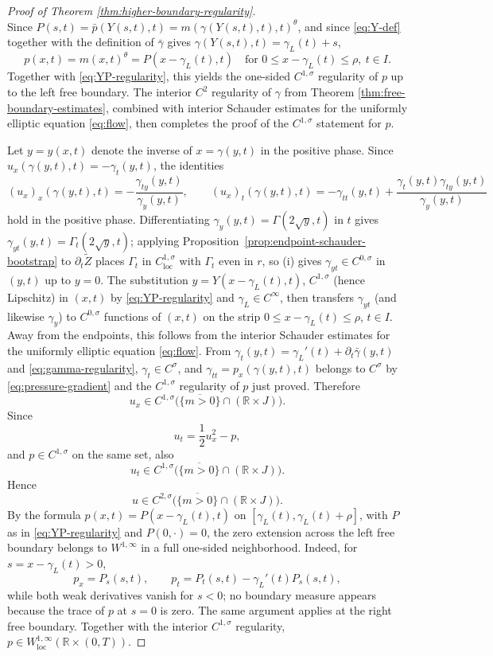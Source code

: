 \documentclass[11pt]{amsart}
\newcommand{\R}{\mathbb R}
\newcommand{\loc}{\mathrm{loc}}
\begin{document}
\begin{proof}[Proof of Theorem \ref{thm:higher-boundary-regularity}]
\begin{equation}
\end{equation}
Since \(P(s,t)=\bar{p}(Y(s,t),t)=m(\gamma(Y(s,t),t),t)^\theta\), and since
\eqref{eq:Y-def} together with the definition of \(\bar{\gamma}\) gives
\(\gamma(Y(s,t),t)=\gamma_L(t)+s\),
\[
        p(x,t)=m(x,t)^\theta=P(x-\gamma_L(t),t)
        \quad\text{for } 0\le x-\gamma_L(t)\le\rho,\ t\in I .
\]
Together with \eqref{eq:YP-regularity}, this yields the one-sided
\(C^{1,\sigma}\) regularity of \(p\) up to the left free boundary.
The interior \(C^2\) regularity of
\(\gamma\) from Theorem \ref{thm:free-boundary-estimates}, combined with
interior Schauder estimates for the uniformly elliptic equation
\eqref{eq:flow}, then completes the proof of the
\(C^{1,\sigma}\) statement for \(p\).

Let \(y=y(x,t)\) denote the inverse of \(x=\gamma(y,t)\) in the positive
phase. Since \(u_x(\gamma(y,t),t)=-\gamma_t(y,t)\), the identities
\[
        (u_x)_x(\gamma(y,t),t)=-\frac{\gamma_{ty}(y,t)}{\gamma_y(y,t)},
        \qquad
        (u_x)_t(\gamma(y,t),t)
        =-\gamma_{tt}(y,t)+\frac{\gamma_t(y,t)\gamma_{ty}(y,t)}
        {\gamma_y(y,t)}
\]
hold in the positive phase. Differentiating
\(\gamma_y(y,t)=\Gamma(2\sqrt y,t)\) in \(t\) gives
\(\gamma_{yt}(y,t)=\Gamma_t(2\sqrt y,t)\); applying
Proposition~\ref{prop:endpoint-schauder-bootstrap} to \(\partial_t\widetilde Z\) places
\(\Gamma_t\) in \(C^{1,\sigma}_{\loc}\) with \(\Gamma_t\) even in \(r\), so (i) gives
\(\gamma_{yt}\in C^{0,\sigma}\) in \((y,t)\) up to \(y=0\). The substitution
\(y=Y(x-\gamma_L(t),t)\), \(C^{1,\sigma}\) (hence Lipschitz) in \((x,t)\) by
\eqref{eq:YP-regularity} and \(\gamma_L\in C^\infty\), then transfers
\(\gamma_{yt}\) (and likewise \(\gamma_y\)) to \(C^{0,\sigma}\) functions of
\((x,t)\) on the strip \(0\le x-\gamma_L(t)\le\rho\), \(t\in I\). Away from the endpoints, this follows from the interior
Schauder estimates for the uniformly elliptic equation \eqref{eq:flow}.
From \(\gamma_t(y,t)=\gamma_L'(t)+\partial_t\bar{\gamma}(y,t)\) and
\eqref{eq:gamma-regularity}, \(\gamma_t\in C^\sigma\), and
\(\gamma_{tt}=p_x(\gamma(y,t),t)\) belongs to \(C^\sigma\) by
\eqref{eq:pressure-gradient} and the \(C^{1,\sigma}\) regularity of \(p\) just
proved.
Therefore
\[
        u_x\in
        C^{1,\sigma}\bigl(\overline{\{m>0\}}\cap(\R\times J)\bigr).
\]
Since
\[
        u_t=\frac12u_x^2-p,
\]
and \(p\in C^{1,\sigma}\) on the same set, also
\[
        u_t\in
        C^{1,\sigma}\bigl(\overline{\{m>0\}}\cap(\R\times J)\bigr).
\]
Hence
\[
        u\in
        C^{2,\sigma}\bigl(\overline{\{m>0\}}\cap(\R\times J)\bigr).
\]
By the formula \(p(x,t)=P(x-\gamma_L(t),t)\) on
\([\gamma_L(t),\gamma_L(t)+\rho]\), with \(P\) as in \eqref{eq:YP-regularity}
and \(P(0,\cdot)=0\), the zero extension across the left free boundary belongs
to \(W^{1,\infty}\) in a full one-sided neighborhood. Indeed, for \(s=x-\gamma_L(t)>0\),
\[
        p_x=P_s(s,t),\qquad p_t=P_t(s,t)-\gamma_L'(t)P_s(s,t),
\]
while both weak derivatives vanish for \(s<0\); no boundary measure appears
because the trace of \(p\) at \(s=0\) is zero. The same argument applies at the
right free boundary. Together with the interior \(C^{1,\sigma}\) regularity,
\(p\in W^{1,\infty}_{\loc}(\R\times(0,T))\).


\end{proof}
\end{document}
